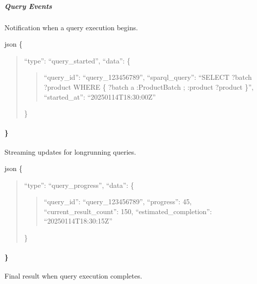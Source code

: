 \documentclass[letterpaper,10pt,english]{sphinxmanual}
\begin{document}
\subparagraph{Query Events}
\label{\detokenize{api/websocket-api:query-events}}
\sphinxAtStartPar
{}
Notification when a query execution begins.

\sphinxAtStartPar
{\color{red}\bfseries{}\textasciigrave{}\textasciigrave{}}{\color{red}\bfseries{}\textasciigrave{}}json
\{
\begin{quote}

\sphinxAtStartPar
“type”: “query\_started”,
“data”: \{
\begin{quote}

\sphinxAtStartPar
“query\_id”: “query\_123456789”,
“sparql\_query”: “SELECT ?batch ?product WHERE \{ ?batch a :ProductBatch ; :product ?product \}”,
“started\_at”: “2025\sphinxhyphen{}01\sphinxhyphen{}14T18:30:00Z”
\end{quote}

\sphinxAtStartPar
\}
\end{quote}


\paragraph{\}}
\label{\detokenize{api/websocket-api:id35}}
\sphinxAtStartPar
{}
Streaming updates for long\sphinxhyphen{}running queries.

\sphinxAtStartPar
{\color{red}\bfseries{}\textasciigrave{}\textasciigrave{}}{\color{red}\bfseries{}\textasciigrave{}}json
\{
\begin{quote}

\sphinxAtStartPar
“type”: “query\_progress”,
“data”: \{
\begin{quote}

\sphinxAtStartPar
“query\_id”: “query\_123456789”,
“progress”: 45,
“current\_result\_count”: 150,
“estimated\_completion”: “2025\sphinxhyphen{}01\sphinxhyphen{}14T18:30:15Z”
\end{quote}

\sphinxAtStartPar
\}
\end{quote}


\paragraph{\}}
\label{\detokenize{api/websocket-api:id40}}
\sphinxAtStartPar
{}
Final result when query execution completes.
\end{document}
